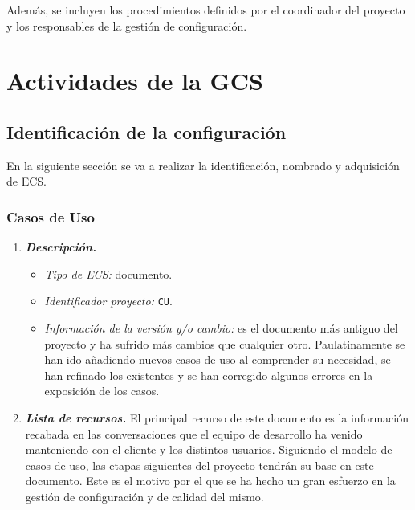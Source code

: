 \documentclass[11pt, a4paper, twoside, titlepage]{article}
\begin{document}
			Además, se incluyen los procedimientos definidos por el coordinador del proyecto y los responsables de la gestión de configuración.

	\section{Actividades de la GCS}
		\subsection{Identificación de la configuración} %
			En la siguiente sección se va a realizar la identificación, nombrado y adquisición de \gls{ECS}.

			\subsubsection{Casos de Uso}
				\begin{enumerate}
					\item {\itshape \bfseries Descripción.}
						\begin{itemize}
							\item \textit{Tipo de ECS:} documento.
							\item \textit{Identificador proyecto:} \verb|CU|.
							\item \textit{Información de la versión y/o cambio:} es el documento más antiguo del proyecto y ha sufrido más cambios que cualquier otro. Paulatinamente se han ido añadiendo nuevos casos de uso al comprender su necesidad, se han refinado los existentes y se han corregido algunos errores en la exposición de los casos.
						\end{itemize}

					\item {\itshape \bfseries Lista de recursos.}
						El principal recurso de este documento es la información recabada en las conversaciones que el equipo de desarrollo ha venido manteniendo con el cliente y los distintos usuarios. Siguiendo el modelo de casos de uso, las etapas siguientes del proyecto tendrán su base en este documento. Este es el motivo por el que se ha hecho un gran esfuerzo en la gestión de configuración y de calidad del mismo.

				\end{enumerate}
\end{document}
